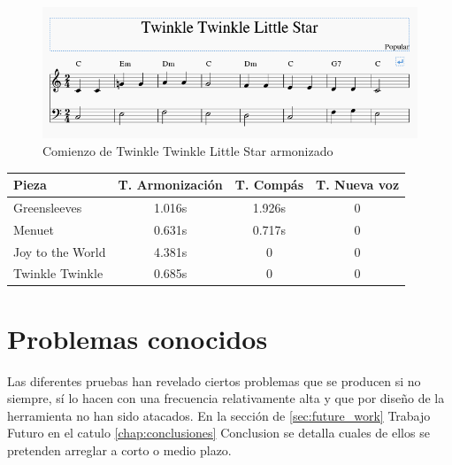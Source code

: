         \begin{figure}
        	\centering
        	\includegraphics[width=0.8\linewidth]{imagenes/evaluation/twinkle_harm.png}
        	\caption{Comienzo de Twinkle Twinkle Little Star armonizado}
        	\label{fig:twinkle_harm}
        \end{figure}
  
  \begin{center}
  	\begin{tabular}{ | l | c | c | c | }
  		\hline
  		Pieza & T. Armonización & T. Compás & T. Nueva voz \\ \hline \hline
  		Greensleeves & 1.016s & 1.926s & 0 \\ \hline
  		Menuet & 0.631s & 0.717s & 0 \\ \hline
  		Joy to the World & 4.381s & 0 & 0 \\ \hline
  		Twinkle Twinkle & 0.685s & 0 & 0 \\ \hline
  	\end{tabular}
  \end{center}
  
  \section{Problemas conocidos}
  \label{sec:known_issues}
  Las diferentes pruebas han revelado ciertos problemas que se producen si no siempre, sí lo hacen con una frecuencia relativamente alta y que por diseño de la herramienta no han sido atacados. En la sección de \ref{sec:future_work} Trabajo Futuro en el catulo \ref{chap:conclusiones} Conclusion se detalla cuales de ellos se pretenden arreglar a corto o medio plazo.
  
